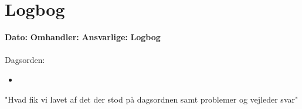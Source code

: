 \section{Logbog}

\textbf{Dato:} 
\textbf{Omhandler:} 
\textbf{Ansvarlige:} 
\textbf{Logbog}
\\
\\
Dagsorden:
\begin{itemize}
	\item 
\end{itemize}


"Hvad fik vi lavet af det der stod på dagsordnen samt problemer og vejleder svar"
